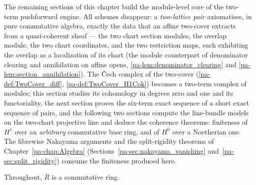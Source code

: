 The remaining sections of this chapter build the module-level core of the two-term
pushforward engine. All schemes disappear: a \emph{two-lattice pair} axiomatises, in pure
commutative algebra, exactly the data that an affine two-cover extracts from a
quasi-coherent sheaf --- the two chart section modules, the overlap module, the two chart
coordinates, and the two restriction maps, each exhibiting the overlap as a localization
of its chart (the module counterpart of denominator clearing and annihilation on affine
opens, \ref{pa-lem:denominator_clearing} and \ref{pa-lem:section_annihilation}). The \v{C}ech
complex of the two-cover (\ref{pa-def:TwoCover_diff}, \ref{pa-def:TwoCover_H1Cok}) becomes a
two-term complex of modules; this section studies its cohomology in degrees zero and one
and its functoriality, the next section proves the six-term exact sequence of a short
exact sequence of pairs, and the following two sections compute the line-bundle models on
the two-chart projective line and deduce the coherence theorems: finiteness of \(H^1\)
over an \emph{arbitrary} commutative base ring, and of \(H^0\) over a Noetherian one. The
fibrewise Nakayama arguments and the split-rigidity theorems of
Chapter~\ref{pa-chap:Algebra} (Sections~\ref{pa-sec:nakayama_vanishing}
and~\ref{pa-sec:split_rigidity}) consume the finiteness produced here.

Throughout, \(R\) is a commutative ring.

